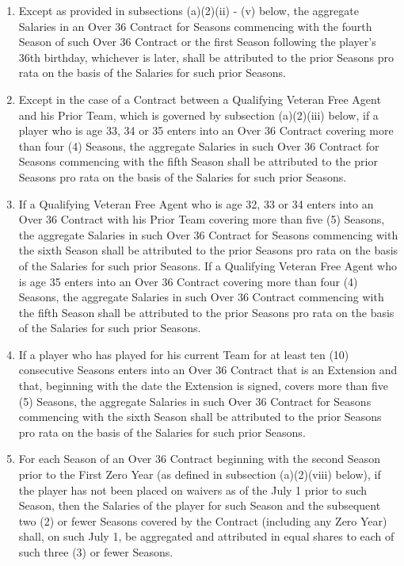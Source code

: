 \documentclass[
]{book}
\providecommand{\tightlist}{%
  \setlength{\itemsep}{0pt}\setlength{\parskip}{0pt}}
\begin{document}
\begin{enumerate}
\begin{enumerate}
    \begin{enumerate}
    \def\labelenumiii{(\roman{enumiii})}
    \tightlist
    \item
      Except as provided in subsections (a)(2)(ii) - (v) below, the aggregate Salaries in an Over 36 Contract for Seasons commencing with the fourth Season of such Over 36 Contract or the first Season following the player's 36th birthday, whichever is later, shall be attributed to the prior Seasons pro rata on the basis of the Salaries for such prior Seasons.
    \item
      Except in the case of a Contract between a Qualifying Veteran Free Agent and his Prior Team, which is governed by subsection (a)(2)(iii) below, if a player who is age 33, 34 or 35 enters into an Over 36 Contract covering more than four (4) Seasons, the aggregate Salaries in such Over 36 Contract for Seasons commencing with the fifth Season shall be attributed to the prior Seasons pro rata on the basis of the Salaries for such prior Seasons.
    \item
      If a Qualifying Veteran Free Agent who is age 32, 33 or 34 enters into an Over 36 Contract with his Prior Team covering more than five (5) Seasons, the aggregate Salaries in such Over 36 Contract for Seasons commencing with the sixth Season shall be attributed to the prior Seasons pro rata on the basis of the Salaries for such prior Seasons. If a Qualifying Veteran Free Agent who is age 35 enters into an Over 36 Contract covering more than four (4) Seasons, the aggregate Salaries in such Over 36 Contract commencing with the fifth Season shall be attributed to the prior Seasons pro rata on the basis of the Salaries for such prior Seasons.
    \item
      If a player who has played for his current Team for at least ten (10) consecutive Seasons enters into an Over 36 Contract that is an Extension and that, beginning with the date the Extension is signed, covers more than five (5) Seasons, the aggregate Salaries in such Over 36 Contract for Seasons commencing with the sixth Season shall be attributed to the prior Seasons pro rata on the basis of the Salaries for such prior Seasons.
    \item
      For each Season of an Over 36 Contract beginning with the second Season prior to the First Zero Year (as defined in subsection (a)(2)(viii) below), if the player has not been placed on waivers as of the July 1 prior to such Season, then the Salaries of the player for such Season and the subsequent two (2) or fewer Seasons covered by the Contract (including any Zero Year) shall, on such July 1, be aggregated and attributed in equal shares to each of such three (3) or fewer Seasons.

\end{enumerate}
\end{enumerate}
\end{enumerate}
\end{document}
